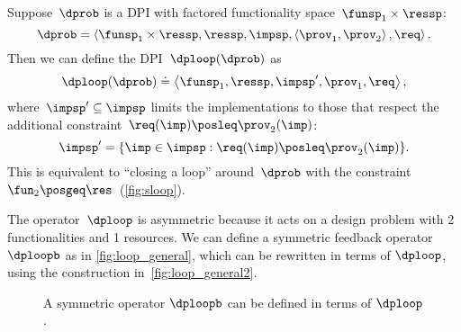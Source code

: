 \begin{definition}[$\dploop$]
  \label{def:dp_loop}Suppose~$\dprob$ is a DPI with factored functionality
  space~$\funsp_{1}\times\ressp$:
  \[
    \dprob=\left\langle \funsp_{1}\times\ressp,\ressp,\impsp,\left\langle \prov_{1},\prov_{2}\right\rangle ,\req\right\rangle.
  \]
  Then we can define the DPI~$\dploop(\dprob)$ as
  \[
    \dploop(\dprob)\doteq\left\langle \funsp_{1},\ressp,\impsp',\prov_{1},\req\right\rangle ,
  \]
  where~$\impsp'\subseteq\impsp$ limits the implementations to those
  that respect the additional constraint~$\req(\imp)\posleq\prov_{2}(\imp)$:
  \[
    \impsp'=\{\imp\in\impsp:\req(\imp)\posleq\prov_{2}(\imp)\}.
  \]
  This is equivalent to ``closing a loop'' around~$\dprob$ with
  the constraint~$\fun_{2}\posgeq\res$~(\cref{fig:sloop}).
\end{definition}


The operator~$\dploop$ is asymmetric because it acts on a design
problem with 2 functionalities and 1 resources. We can define a symmetric
feedback operator $\dploopb$ as in \cref{fig:loop_general}, which
can be rewritten in terms of $\dploop$, using the construction in~\cref{fig:loop_general2}\emph{.}

\begin{figure}[h]
  \hspace*{\fill}
  \hspace*{\fill}
  \hspace*{\fill}
  \caption{A symmetric operator $\dploopb$ can be defined in terms of $\dploop$.}
\end{figure}

